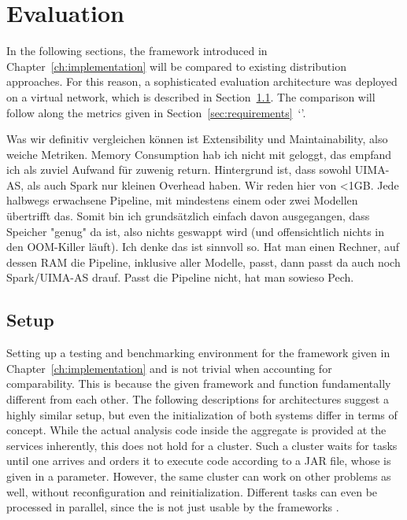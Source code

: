 \chapter{Evaluation}
\label{ch:evaluation}
In the following sections, the framework introduced in Chapter~\ref{ch:implementation} will be compared to existing \uima{} distribution approaches. For this reason, a sophisticated evaluation architecture was deployed on a virtual network, which is described in Section~\ref{sec:setup}. The comparison will follow along the metrics given in Section~\ref{sec:requirements}~`'.


Was wir definitiv vergleichen können ist Extensibility und Maintainability, also weiche Metriken. Memory Consumption hab ich nicht mit geloggt, das empfand ich als zuviel Aufwand für zuwenig return. Hintergrund ist, dass sowohl UIMA-AS, als auch Spark nur kleinen Overhead haben. Wir reden hier von <1GB. Jede halbwegs erwachsene Pipeline, mit mindestens einem oder zwei Modellen übertrifft das. Somit bin ich grundsätzlich einfach davon ausgegangen, dass Speicher "genug" da ist, also nichts geswappt wird (und offensichtlich nichts in den OOM-Killer läuft). Ich denke das ist sinnvoll so. Hat man einen Rechner, auf dessen RAM die Pipeline, inklusive aller Modelle, passt, dann passt da auch noch Spark/UIMA-AS drauf. Passt die Pipeline nicht, hat man sowieso Pech.

\section{Setup}
\label{sec:setup}
Setting up a testing and benchmarking environment for the framework given in Chapter~\ref{ch:implementation} and \uimaas{} is not trivial when accounting for comparability. This is because the given framework and \uimaas{} function fundamentally different from each other. The following descriptions for \docker{} architectures suggest a highly similar setup, but even the initialization of both systems differ in terms of concept. While the actual analysis code inside the aggregate \anen{} is provided at the \uimaas{} services inherently, this does not hold for a \spark{} cluster. Such a \spark{} cluster waits for tasks until one arrives and orders it to execute code according to a JAR file, whose \URL{} is given in a parameter. However, the same cluster can work on other problems as well, without reconfiguration and reinitialization. Different tasks can even be processed in parallel, since the \spark{} is not just usable by the frameworks \api{}.

